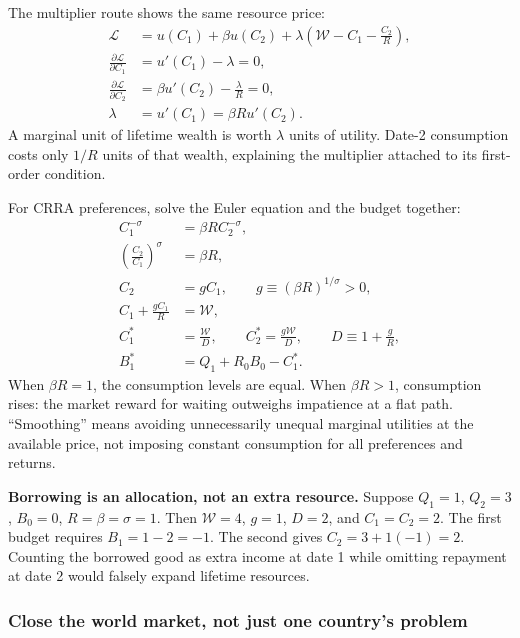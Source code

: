 The multiplier route shows the same resource price:
\begin{align}
 \mathcal L&=u(C_1)+\beta u(C_2)
   +\lambda\left(\mathcal W-C_1-\frac{C_2}{R}\right),\\
 \frac{\partial\mathcal L}{\partial C_1}&=u'(C_1)-\lambda=0,\\
 \frac{\partial\mathcal L}{\partial C_2}&=\beta u'(C_2)-\frac\lambda R=0,\\
 \lambda&=u'(C_1)=\beta R u'(C_2).
\end{align}
A marginal unit of lifetime wealth is worth $\lambda$ units of utility.
Date-2 consumption costs only $1/R$ units of that wealth, explaining the
multiplier attached to its first-order condition.

For CRRA preferences, solve the Euler equation and the budget together:
\begin{align}
 C_1^{-\sigma}&=\beta R C_2^{-\sigma},\\
 \left(\frac{C_2}{C_1}\right)^\sigma&=\beta R,\\
 C_2&=gC_1,\qquad g\equiv(\beta R)^{1/\sigma}>0,\\
 C_1+\frac{gC_1}{R}&=\mathcal W,\\
 C_1^*&=\frac{\mathcal W}{D},\qquad
 C_2^*=\frac{g\mathcal W}{D},\qquad D\equiv1+\frac gR,\label{eq:open-crra-choice}\\
 B_1^*&=Q_1+R_0B_0-C_1^*.
\end{align}
When $\beta R=1$, the consumption levels are equal. When $\beta R>1$,
consumption rises: the market reward for waiting outweighs impatience at a
flat path. ``Smoothing'' means avoiding unnecessarily unequal marginal
utilities at the available price, not imposing constant consumption for all
preferences and returns.

\begin{redblock}
\textbf{Borrowing is an allocation, not an extra resource.}
Suppose $Q_1=1$, $Q_2=3$, $B_0=0$, $R=\beta=\sigma=1$.
Then $\mathcal W=4$, $g=1$, $D=2$, and $C_1=C_2=2$.
The first budget requires $B_1=1-2=-1$. The second gives
$C_2=3+1(-1)=2$. Counting the borrowed good as extra income at date 1
while omitting repayment at date 2 would falsely expand lifetime resources.
\end{redblock}

\subsubsection{Close the world market, not just one country's problem}

